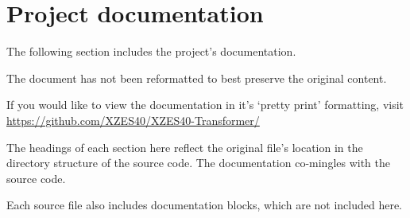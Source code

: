 \section{Project documentation}

The following section includes the project's documentation.

The document has not been reformatted to best preserve the original content.

If you would like to view the documentation in it's `pretty print' formatting, visit \\ \url{https://github.com/XZES40/XZES40-Transformer/}

The headings of each section here reflect the original file's location in the directory structure of the source code.
The documentation co-mingles with the source code.

Each source file also includes documentation blocks, which are not included here.

















